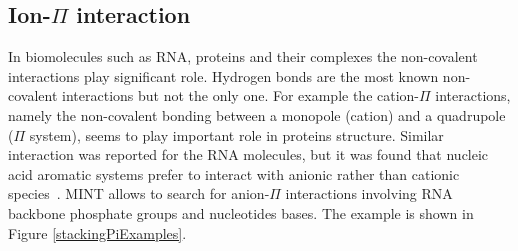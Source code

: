\documentclass[12pt]{article}
\begin{document}

\subsection{Ion-$\Pi$ interaction}
In biomolecules such as RNA, proteins and their complexes the non-covalent interactions play significant role. Hydrogen bonds are the most known non-covalent interactions but not the only one. For example the cation-$\Pi$ interactions, namely the non-covalent bonding between a monopole (cation) and a quadrupole ($\Pi$ system), seems to play important role in proteins structure.
Similar interaction was reported for the RNA molecules, but it was found that nucleic acid aromatic systems prefer to interact with anionic rather than cationic species~\cite{Auffinger_davos}. 
MINT allows to search for anion-$\Pi$ interactions involving RNA backbone phosphate groups and nucleotides bases. The example is shown in Figure \ref{stackingPiExamples}.
\end{document}
